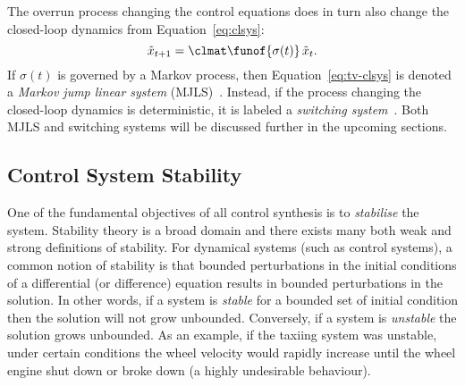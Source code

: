 The overrun process changing the control equations does in turn also change the closed-loop dynamics from Equation~\eqref{eq:clsys}:
%
\begin{equation}%
    \label{eq:tv-clsys}%
    \tilde{x}_{t+1} = \clmat\funof{\sigma(t)}\, \tilde{x}_t.
\end{equation}
%
If $\sigma(t)$ is governed by a Markov process, then Equation~\eqref{eq:tv-clsys} is denoted a \emph{Markov jump linear system} (MJLS)~\cite{Feng:1992}.
Instead, if the process changing the closed-loop dynamics is deterministic, it is labeled a \emph{switching system}~\cite{Liberzon:2003}.
Both MJLS and switching systems will be discussed further in the upcoming sections.



\subsection{Control System Stability}%
\label{sec:background:stability}%
%
One of the fundamental objectives of all control synthesis is to \emph{stabilise} the system.
Stability theory is a broad domain and there exists many both weak and strong definitions of stability.
For dynamical systems (such as control systems), a common notion of stability is that bounded perturbations in the initial conditions of a differential (or difference) equation results in bounded perturbations in the solution.
In other words, if a system is \emph{stable} for a bounded set of initial condition then the solution will not grow unbounded.
Conversely, if a system is \emph{unstable} the solution grows unbounded.
As an example, if the taxiing system was unstable, under certain conditions the wheel velocity would rapidly increase until the wheel engine shut down or broke down (a highly undesirable behaviour).

